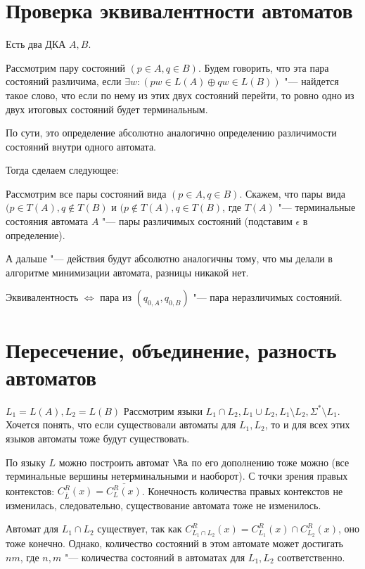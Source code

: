 \section{Проверка эквивалентности автоматов}

\begin{Def}
Есть два ДКА $A, B$.

Рассмотрим пару состояний $(p \in A, q \in B)$. 
Будем говорить, что эта пара состояний различима, если $\exists w: (pw \in L(A) \oplus qw \in L(B))$ "---
найдется такое слово, что если по нему из этих двух состояний перейти, то ровно одно из двух итоговых состояний будет терминальным.
\end{Def}
\begin{Rem}
По сути, это определение абсолютно аналогично определению различимости состояний внутри одного автомата.
\end{Rem}

Тогда сделаем следующее:

Рассмотрим все пары состояний вида $(p \in A, q \in B)$.
Скажем, что пары вида $(p \in T(A), q \notin T(B)$ и $(p \notin T(A), q \in T(B)$, где $T(A)$ "--- терминальные состояния автомата $A$ "--- пары различимых состояний (подставим $\epsilon$ в определение).

А дальше "--- действия будут абсолютно аналогичны тому, что мы делали в алгоритме минимизации автомата, разницы никакой нет.

Эквивалентность $\iff$ пара из $(q_{0, A}, q_{0, B})$ "--- пара неразличимых состояний.

\section{Пересечение, объединение, разность автоматов}
$L_1 = L(A), L_2 = L(B)$
Рассмотрим языки $L_1 \cap L_2, L_1 \cup L_2, L_1 \setminus L_2, \Sigma^* \setminus L_1$. 
Хочется понять, что если существовали автоматы для $L_1, L_2$, то и для всех этих языков автоматы тоже будут существовать. 

По языку $L$ можно построить автомат $\Ra$ по его дополнению тоже можно (все терминальные вершины нетерминальными и наоборот).
С точки зрения правых контекстов: $C_{\overline{L}}^R(x) = \overline{C_L^R(x)}$. Конечность количества правых контекстов не изменилась, следовательно, существование автомата тоже не изменилось.

Автомат для $L_1 \cap L_2$ существует, так как $C_{L_1 \cap L_2}^R(x) = C_{L_1}^R(x) \cap C_{L_2}^R(x)$, оно тоже конечно. 
Однако, количество состояний в этом автомате может достигать $nm$, где $n, m$ "--- количества состояний в автоматах для $L_1, L_2$ соответственно.

